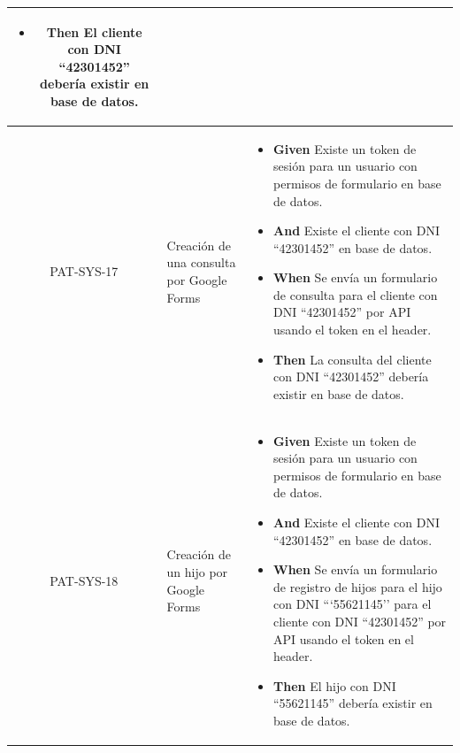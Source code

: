 \begin{longtable}{|c|p{2.5cm}|p{10.5cm}|}
\begin{itemize}
        \newline
        \item \textbf{Then} El cliente con DNI ``42301452'' debería existir en base de datos.
    \end{itemize}
    \\
    \hline
    PAT-SYS-17 & Creación de una consulta por Google Forms & 
    \begin{itemize}
        \item \textbf{Given} Existe un token de sesión para un usuario con permisos de formulario en base de datos.
        \item \textbf{And} Existe el cliente con DNI ``42301452'' en base de datos.
        \newline
        \item \textbf{When} Se envía un formulario de consulta para el cliente con DNI ``42301452'' por API usando el token en el header.
        \newline
        \item \textbf{Then} La consulta del cliente con DNI ``42301452'' debería existir en base de datos.
    \end{itemize}
    \\
    \hline
    PAT-SYS-18 & Creación de un hijo por Google Forms & 
    \begin{itemize}
        \item \textbf{Given} Existe un token de sesión para un usuario con permisos de formulario en base de datos.
        \item \textbf{And} Existe el cliente con DNI ``42301452'' en base de datos.
        \newline
        \item \textbf{When} Se envía un formulario de registro de hijos para el hijo con DNI ```55621145'' para el cliente con DNI ``42301452'' por API usando el token en el header.
        \newline
        \item \textbf{Then} El hijo con DNI ``55621145'' debería existir en base de datos.
    \end{itemize}
    \\
    \hline
\end{longtable}
